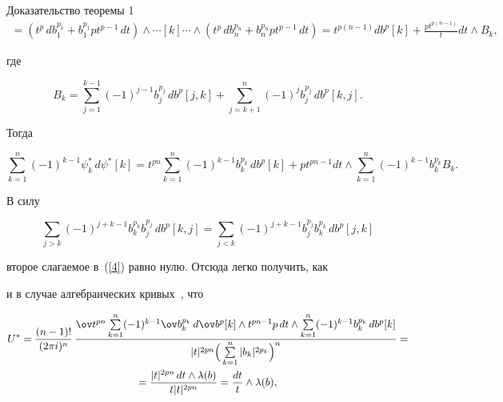 \begin{pf*}{Доказательство теоремы 1}
\begin{multline*}
=(t^p\,db_1^{p_1}+b_1^{p_1}pt^{p-1}\,dt)\wedge\dotsb[k]\dotsb\wedge


(t^p\,db_n^{p_n}+b_n^{p_n}pt^{p-1}\,dt)=


t^{p(n-1)}db^p[k]+\frac{pt^{p(n-1)}}{t}dt\wedge B_k,


\end{multline*}


где


$$


B_k=\sum_{j=1}^{k-1}


(-1)^{j-1}b_j^{p_j}\,db^p[j,k]+\sum\limits_{j=k+1}^{n}(-1)^{j}b_j^{p_j}\,


db^p[k,j].


$$


Тогда


\begin{equation}\label{4}


\sum\limits_{k=1}^n(-1)^{k-1}\psi_k^*\,d\psi^*[k]=


t^{pn}\sum_{k=1}^n(-1)^{k-1}b_k^{p_k}\,db^p[k]+


pt^{pn-1}dt\wedge\sum_{k=1}^n(-1)^{k-1}b_k^{p_k}B_k.


\end{equation}





В силу


$$


\sum_{j>k}(-1)^{j+k-1}b_k^{p_k}b_j^{p_j}\,db^p[k,j]=


\sum_{j<k}(-1)^{j+k-1}b_j^{p_j}b_k^{p_k}\,db^p[j,k]


$$


второе слагаемое в~(\ref{4}) равно нулю. Отсюда легко получить, как


и в случае алгебраических кривых~\cite{KM1}, что


\begin{multline}\label{5}


U^*=\frac{(n-1)!}{(2\pi i)^n}\,\frac{\ov t^{pn}\sum\limits_{k=1}^n(-1)^{k-1}


\ov b_k^{p_k}\,d\ov b^p[k]\wedge t^{pn-1}p\,dt\wedge


\sum\limits_{k=1}^n(-1)^{k-1}


b_k^{p_k}\,db^p[k]}{|t|^{2pn}\Big(\sum\limits_{k=1}^n|b_k|^{2p_k}\Big)^n}= \\


=\frac{|t|^{2pn}\,dt\wedge\lambda(b)}{t|t|^{2pn}}=\frac{dt}t\wedge\lambda(b),


\end{multline}



\end{pf*}

